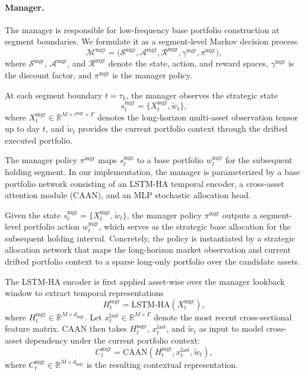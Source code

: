 \documentclass[letterpaper]{article} %
\begin{document}
\paragraph{Manager.}

The manager is responsible for low-frequency base portfolio construction at segment boundaries. We formulate it as a segment-level Markov decision process
\[
\mathcal{M}^{\mathrm{mgr}}
=
\bigl(
\mathcal{S}^{\mathrm{mgr}},
\mathcal{A}^{\mathrm{mgr}},
\mathcal{R}^{\mathrm{mgr}},
\gamma^{\mathrm{mgr}},
\pi^{\mathrm{mgr}}
\bigr),
\]
where \(\mathcal{S}^{\mathrm{mgr}}\), \(\mathcal{A}^{\mathrm{mgr}}\), and \(\mathcal{R}^{\mathrm{mgr}}\) denote the state, action, and reward spaces, \(\gamma^{\mathrm{mgr}}\) is the discount factor, and \(\pi^{\mathrm{mgr}}\) is the manager policy.

At each segment boundary \(t=\tau_k\), the manager observes the strategic state
\[
s_t^{\mathrm{mgr}}=\{X_t^{\mathrm{mgr}},\tilde w_t\},
\]
where \(X_t^{\mathrm{mgr}}\in\mathbb{R}^{M\times\tau^{\mathrm{mgr}}\times F}\) denotes the long-horizon multi-asset observation tensor up to day \(t\), and \(\tilde w_t\) provides the current portfolio context through the drifted executed portfolio.


The manager policy \(\pi^{\mathrm{mgr}}\) maps \(s_t^{\mathrm{mgr}}\) to a base portfolio \(w_t^{\mathrm{mgr}}\) for the subsequent holding segment. In our implementation, the manager is parameterized by a base portfolio network consisting of an LSTM-HA temporal encoder, a cross-asset attention module (CAAN)\citep{alphastock}, and an MLP stochastic allocation head.

Given the state \(s_t^{\mathrm{mgr}}=\{X_t^{\mathrm{mgr}},\tilde w_t\}\), the manager policy \(\pi^{\mathrm{mgr}}\) outputs a segment-level portfolio action \(w_t^{\mathrm{mgr}}\), which serves as the strategic base allocation for the subsequent holding interval. Concretely, the policy is instantiated by a strategic allocation network that maps the long-horizon market observation and current drifted portfolio context to a sparse long-only portfolio over the candidate assets.

The LSTM-HA encoder is first applied asset-wise over the manager lookback window to extract temporal representations
\[
H_t^{\mathrm{mgr}}=\mathrm{LSTM\mbox{-}HA}(X_t^{\mathrm{mgr}}),
\]
where \(H_t^{\mathrm{mgr}}\in\mathbb{R}^{M\times d_{\mathrm{mgr}}}\). Let \(x_t^{\mathrm{last}}\in\mathbb{R}^{M\times F}\) denote the most recent cross-sectional feature matrix. CAAN then takes \(H_t^{\mathrm{mgr}}\), \(x_t^{\mathrm{last}}\), and \(\tilde w_t\) as input to model cross-asset dependency under the current portfolio context:
\[
C_t^{\mathrm{mgr}}
=
\mathrm{CAAN}\!\left(
H_t^{\mathrm{mgr}},
x_t^{\mathrm{last}},
\tilde w_t
\right),
\]
where \(C_t^{\mathrm{mgr}}\in\mathbb{R}^{M\times d_{\mathrm{mgr}}}\) is the resulting contextual representation.
\end{document}
